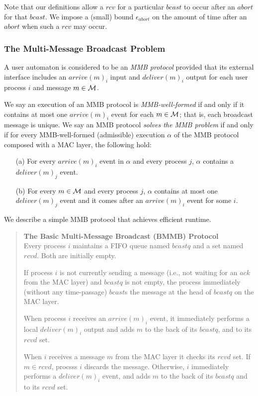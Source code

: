 Note that our definitions allow a $rcv$ for a particular $bcast$
to occur after an $abort$ for that $bcast$.
We impose a (small) bound $\epsilon_{abort}$ on the amount of time
after an $abort$ when such a $rcv$ may occur.






\subsubsection{The Multi-Message Broadcast Problem}
\label{sec:mmb:prelim}

A user automaton is considered to be an {\em MMB protocol} provided
that its external interface includes an $arrive(m)_i$ input
and $deliver(m)_i$ output for each user process $i$
and message $m\in {\cal M}$.

We say an execution of an MMB protocol is {\em MMB-well-formed} if and only if it
contains at most one $arrive(m)_i$
event for each $m\in {\cal M}$;
that is, each broadcast message is unique.
We say an MMB protocol {\em solves the MMB problem}
if and only if for every MMB-well-formed (admissible) execution $\alpha$
of the MMB protocol composed with a MAC layer,
the following hold:
\begin{enumerate}
\item[(a)]
For every $arrive(m)_i$ event in $\alpha$ and every process $j$,
$\alpha$ contains a $deliver(m)_j$ event.
\item[(b)]
For every $m\in {\cal M}$ and every process $j$,
$\alpha$ contains at most one $deliver(m)_j$ event and it
comes after an $arrive(m)_i$ event for some $i$.
\end{enumerate}




We describe a simple MMB protocol that achieves efficient runtime.

\begin{quote}\small
{\bf The Basic Multi-Message Broadcast (BMMB) Protocol }\\
Every process $i$ maintains a FIFO queue named $bcastq$ and a set
named $rcvd$.
Both are initially empty.

If process $i$ is not currently sending a message (i.e., not waiting
for an $ack$ from the MAC layer) and $bcastq$ is not empty, the
process immediately (without any time-passage) $bcast$s the message at
the head of $bcastq$ on the MAC layer.

When process $i$ receives an $arrive(m)_i$ event, it immediately
performs a local $deliver(m)_i$ output and adds $m$ to the back of its
$bcastq$, and to its $rcvd$ set.

When $i$ receives a  message $m$ from the MAC layer it checks
its $rcvd$ set.
If $m \in rcvd$, procsss $i$ discards the message.
Otherwise, $i$ immediately performs a $deliver(m)_i$ event,
and adds $m$ to the back of its $bcastq$ and to its $rcvd$ set.
\end{quote}


